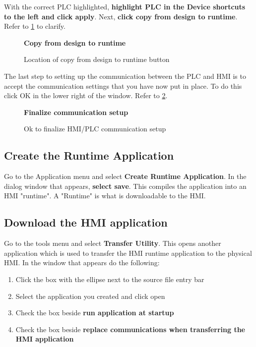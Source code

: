 With the correct PLC highlighted, \textbf{highlight PLC in the Device shortcuts to the left and click apply}. Next, \textbf{click copy from design to runtime}. Refer to \figureautorefname \ref{fig:CopyfromDesignToRuntime} to clarify.

\begin{figure}[h]
\centering
\textbf{Copy from design to runtime}\par \medskip
{}
\caption{Location of copy from design to runtime button}
\label{fig:CopyfromDesignToRuntime}
\end{figure}

The last step to setting up the communication between the PLC and HMI is to accept the communication settings that you have now put in place. To do this click OK in the lower right of the window. Refer to \figureautorefname \ref{fig:FinalizeCommunicationSettings}.

\begin{figure}[h]
\centering
\textbf{Finalize communication setup}\par \medskip
{}
\caption{Ok to finalize HMI/PLC communication setup}
\label{fig:FinalizeCommunicationSettings}
\end{figure}


\subsection{Create the Runtime Application}

Go to the Application menu and select \textbf{Create Runtime Application}. In the dialog window that appears, \textbf{select save}. This compiles the application into an HMI "runtime". A "Runtime" is what is downloadable to the HMI. 

\subsection{Download the HMI application}

Go to the tools menu and select \textbf{Transfer Utility}. This opens another application which is used to transfer the HMI runtime application to the physical HMI. In the window that appears do the following:

\begin{enumerate}
    \item Click the box with the ellipse next to the source file entry bar
    \item Select the application you created and click open
    \item Check the box beside \textbf{run application at startup}
    \item Check the box beside \textbf{replace communications when transferring the HMI application}
\end{enumerate}

